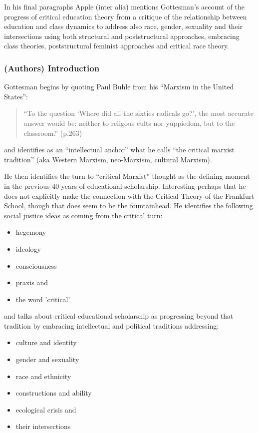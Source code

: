 \documentclass[10pt,titlepage]{book}
\begin{document}
In his final paragraphs Apple (inter alia) mentions Gottesman's account of the progress of critical education theory from a critique of the relationship between education and class dynamics to address also race, gender, sexuality and their intersections using both structural and poststructural approaches, embracing class theories, poststructural feminist approaches and critical race theory.

\subsubsection{(Authors) Introduction}

Gottesman begins by quoting Paul Buhle from his ``Marxism in the United States''\cite{buhle-histmarx}:

\begin{quotation}
  ``To the question `Where did all the sixties radicals go?', the most accurate answer would be: neither to religous cults nor yuppiedom, but to the classroom.'' (p.263)
  \end{quotation}
and identifies as an ``intellectual anchor'' what he calls ``the critical marxist tradition'' (aka Western Marxism, neo-Marxism, cultural Marxism).

He then identifies the turn to ``critical Marxist'' thought as the defining moment in the previous 40 years of educational scholarship.
Interesting perhaps that he does not explicitly make the connection with the Critical Theory of the Frankfurt School, though that does seem to be the fountainhead.
He identifies the following social justice ideas as coming from the critical turn:

\begin{itemize}
\item hegemony
\item ideology
\item consciousness
\item praxis
  and
  \item the word 'critical'
  \end{itemize}

and talks about critical educational scholarship as progressing beyond that tradition by embracing intellectual and political traditions addressing:

\begin{itemize}
\item culture and identity
\item gender and sexuality
\item race and ethnicity
\item constructions and ability
\item ecological crisis
  and
\item their intersections  
\end{itemize}
\end{document}
